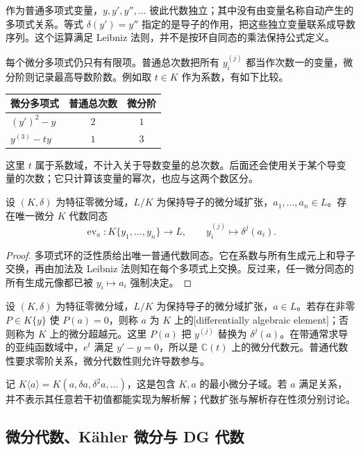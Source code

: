 作为普通多项式变量，\(y,y',y'',\ldots\) 彼此代数独立；其中没有由变量名称自动产生的多项式关系。等式 \(\delta(y')=y''\) 指定的是导子的作用，把这些独立变量联系成导数序列。这个运算满足 Leibniz 法则，并不是按环自同态的乘法保持公式定义。

\ProseParagraphBreak
每个微分多项式仍只有有限项。普通总次数把所有 \(y_i^{(j)}\) 都当作次数一的变量，微分阶则记录最高导数阶数。例如取 \(t\in K\) 作为系数，有如下比较。
\begin{center}
	\begin{tabular}{@{}lcc@{}}
		\toprule
		微分多项式 & 普通总次数 & 微分阶 \\
		\midrule
		\((y')^2-y\) & \(2\) & \(1\) \\
		\(y^{(3)}-ty\) & \(1\) & \(3\) \\
		\bottomrule
	\end{tabular}
\end{center}
这里 \(t\) 属于系数域，不计入关于导数变量的总次数。后面还会使用关于某个导变量的次数；它只计算该变量的幂次，也应与这两个数区分。

\begin{proposition}\label{b3:prop:differential-polynomial-universal}
	设 \((K,\delta)\) 为特征零微分域，\(L/K\) 为保持导子的微分域扩张，\(a_1,\ldots,a_n\in L\)。存在唯一微分 \(K\) 代数同态
	\[
		\operatorname{ev}_a:K\{y_1,\ldots,y_n\}\longrightarrow L, \qquad y_i^{(j)}\longmapsto\delta^j(a_i).
	\]
\end{proposition}
\begin{proof}
	多项式环的泛性质给出唯一普通代数同态。它在系数与所有生成元上和导子交换，再由加法及 Leibniz 法则知在每个多项式上交换。反过来，任一微分同态的所有生成元像都已被 \(y_i\mapsto a_i\) 强制决定。
\end{proof}

设 \((K,\delta)\) 为特征零微分域，\(L/K\) 为保持导子的微分域扩张，\(a\in L\)。若存在非零 \(P\in K\{y\}\) 使 \(P(a)=0\)，则称 \(a\) 为 \(K\) 上的[differentially algebraic element]；否则称为 \(K\) 上的微分超越元。这里 \(P(a)\) 把 \(y^{(j)}\) 替换为 \(\delta^j(a)\)。在带通常求导的亚纯函数域中，\(e^t\) 满足 \(y'-y=0\)，所以是 \(\mathbb C(t)\) 上的微分代数元。普通代数性要求零阶关系，微分代数性则允许导数参与。

\ProseParagraphBreak
记 \(K\langle a\rangle=K(a,\delta a,\delta^2a,\ldots)\)，这是包含 \(K,a\) 的最小微分子域。若 \(a\) 满足关系，并不表示其任意若干初值都能实现为解析解；代数扩张与解析存在性须分别讨论。

\subsection{微分代数、Kähler 微分与 DG 代数}
\label{b3:subsec:E01:03}

